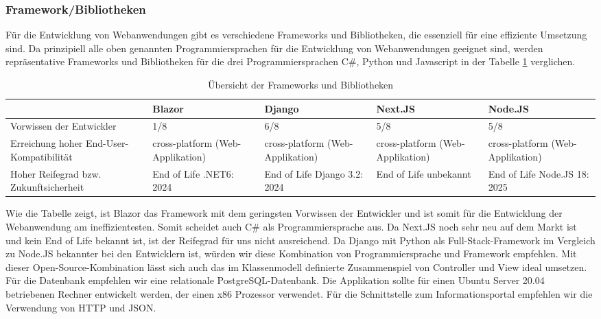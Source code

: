 \subsubsection*{Framework/Bibliotheken}

Für die Entwicklung von Webanwendungen gibt es verschiedene Frameworks und Bibliotheken, die essenziell für eine effiziente Umsetzung sind.
Da prinzipiell alle oben genannten Programmiersprachen für die Entwicklung von Webanwendungen geeignet sind, werden repräsentative Frameworks und Bibliotheken für die drei Programmiersprachen C\#, Python und Javascript in der Tabelle \ref{tab:frameworks} verglichen.

\begin{table}[H]
  \begin{tabular} {|m{3cm}|m{3cm}|m{3cm}|m{3cm}|m{3cm}|}
    \hline
    & Blazor & Django & Next.JS & Node.JS \\
    \hline
    Vorwissen der Entwickler & 1/8 & 6/8 & 5/8 & 5/8 \\
    \hline
    Erreichung hoher End-User-Kompatibilität & cross-platform (Web-Applikation) & cross-platform (Web-Applikation) & cross-platform (Web-Applikation) & cross-platform (Web-Applikation) \\
    \hline
    Hoher Reifegrad bzw. Zukunftsicherheit & End of Life .NET6: 2024\cite{noauthor_.net_nodate} & End of Life Django 3.2: 2024\cite{noauthor_django_nodate} & End of Life unbekannt & End of Life Node.JS 18: 2025\cite{noauthor_node.js_nodate}\\
    \hline
  \end{tabular}
  \caption{Übersicht der Frameworks und Bibliotheken}
  \label{tab:frameworks}
\end{table}\noindent
Wie die Tabelle zeigt, ist Blazor das Framework mit dem geringsten Vorwissen der Entwickler und ist somit für die Entwicklung der Webanwendung am ineffizientesten.
Somit scheidet auch C\# als Programmiersprache aus.
Da Next.JS noch sehr neu auf dem Markt ist und kein End of Life bekannt ist, ist der Reifegrad für uns nicht ausreichend.
Da Django mit Python als Full-Stack-Framework im Vergleich zu Node.JS bekannter bei den Entwicklern ist, würden wir diese Kombination von Programmiersprache und Framework empfehlen.
Mit dieser Open-Source-Kombination lässt sich auch das im Klassenmodell definierte Zusammenspiel von Controller und View ideal umsetzen.
Für die Datenbank empfehlen wir eine relationale PostgreSQL-Datenbank.
Die Applikation sollte für einen Ubuntu Server 20.04 betriebenen Rechner entwickelt werden, der einen x86 Prozessor verwendet.
Für die Schnittstelle zum Informationsportal empfehlen wir die Verwendung von HTTP und JSON.

